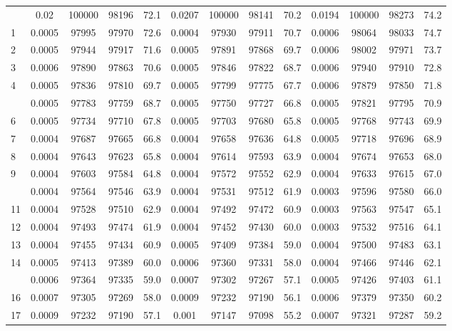 \documentclass[
  14pt,
]{article}
\begin{document}
\begin{longtable}[t]{lcccccccccccc}
\endfoot
\bottomrule
\endlastfoot
0 & 0.02 & 100000 & 98196 & 72.1 & 0.0207 & 100000 & 98141 & 70.2 & 0.0194 & 100000 & 98273 & 74.2\\
1 & 0.0005 & 97995 & 97970 & 72.6 & 0.0004 & 97930 & 97911 & 70.7 & 0.0006 & 98064 & 98033 & 74.7\\
2 & 0.0005 & 97944 & 97917 & 71.6 & 0.0005 & 97891 & 97868 & 69.7 & 0.0006 & 98002 & 97971 & 73.7\\
3 & 0.0006 & 97890 & 97863 & 70.6 & 0.0005 & 97846 & 97822 & 68.7 & 0.0006 & 97940 & 97910 & 72.8\\
4 & 0.0005 & 97836 & 97810 & 69.7 & 0.0005 & 97799 & 97775 & 67.7 & 0.0006 & 97879 & 97850 & 71.8\\
\addlinespace
5 & 0.0005 & 97783 & 97759 & 68.7 & 0.0005 & 97750 & 97727 & 66.8 & 0.0005 & 97821 & 97795 & 70.9\\
6 & 0.0005 & 97734 & 97710 & 67.8 & 0.0005 & 97703 & 97680 & 65.8 & 0.0005 & 97768 & 97743 & 69.9\\
7 & 0.0004 & 97687 & 97665 & 66.8 & 0.0004 & 97658 & 97636 & 64.8 & 0.0005 & 97718 & 97696 & 68.9\\
8 & 0.0004 & 97643 & 97623 & 65.8 & 0.0004 & 97614 & 97593 & 63.9 & 0.0004 & 97674 & 97653 & 68.0\\
9 & 0.0004 & 97603 & 97584 & 64.8 & 0.0004 & 97572 & 97552 & 62.9 & 0.0004 & 97633 & 97615 & 67.0\\
\addlinespace
10 & 0.0004 & 97564 & 97546 & 63.9 & 0.0004 & 97531 & 97512 & 61.9 & 0.0003 & 97596 & 97580 & 66.0\\
11 & 0.0004 & 97528 & 97510 & 62.9 & 0.0004 & 97492 & 97472 & 60.9 & 0.0003 & 97563 & 97547 & 65.1\\
12 & 0.0004 & 97493 & 97474 & 61.9 & 0.0004 & 97452 & 97430 & 60.0 & 0.0003 & 97532 & 97516 & 64.1\\
13 & 0.0004 & 97455 & 97434 & 60.9 & 0.0005 & 97409 & 97384 & 59.0 & 0.0004 & 97500 & 97483 & 63.1\\
14 & 0.0005 & 97413 & 97389 & 60.0 & 0.0006 & 97360 & 97331 & 58.0 & 0.0004 & 97466 & 97446 & 62.1\\
\addlinespace
15 & 0.0006 & 97364 & 97335 & 59.0 & 0.0007 & 97302 & 97267 & 57.1 & 0.0005 & 97426 & 97403 & 61.1\\
16 & 0.0007 & 97305 & 97269 & 58.0 & 0.0009 & 97232 & 97190 & 56.1 & 0.0006 & 97379 & 97350 & 60.2\\
17 & 0.0009 & 97232 & 97190 & 57.1 & 0.001 & 97147 & 97098 & 55.2 & 0.0007 & 97321 & 97287 & 59.2\\

\end{longtable}
\end{document}
